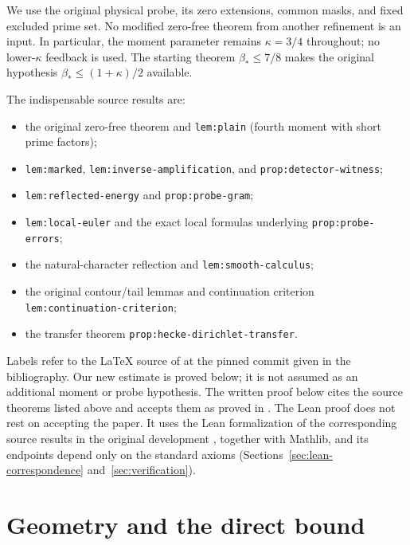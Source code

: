 \documentclass[11pt]{article}
\newcommand{\Bstar}{\beta_*}
\begin{document}
We use the original physical probe, its zero extensions, common masks,
and fixed excluded prime set. No modified zero-free theorem from another
refinement is an input. In particular, the moment parameter remains
$\kappa=3/4$ throughout; no lower-$\kappa$ feedback is used.
The starting theorem $\Bstar\le7/8$ makes the original hypothesis
$\Bstar\le(1+\kappa)/2$ available.

The indispensable source results are:
\begin{itemize}
\item the original zero-free theorem and \texttt{lem:plain}
(fourth moment with short prime factors);
\item \texttt{lem:marked}, \texttt{lem:inverse-amplification}, and
\texttt{prop:detector-witness};
\item \texttt{lem:reflected-energy} and \texttt{prop:probe-gram};
\item \texttt{lem:local-euler} and the exact local formulas underlying
\texttt{prop:probe-errors};
\item the natural-character reflection and \texttt{lem:smooth-calculus};
\item the original contour/tail lemmas and continuation criterion\\
\texttt{lem:continuation-criterion};
\item the transfer theorem \texttt{prop:hecke-dirichlet-transfer}.
\end{itemize}
Labels refer to the \LaTeX{} source of \cite{openai} at the pinned
commit given in the bibliography.
Our new estimate is proved below; it is not assumed as an additional
moment or probe hypothesis. The written proof below cites the source
theorems listed above and accepts them as proved in \cite{openai}. The
Lean proof does not rest on accepting the paper. It uses the Lean
formalization of the corresponding source results in the original
development \cite{fork}, together with Mathlib, and its endpoints depend
only on the standard axioms (Sections~\ref{sec:lean-correspondence}
and~\ref{sec:verification}).

\section{Geometry and the direct bound}
\end{document}
